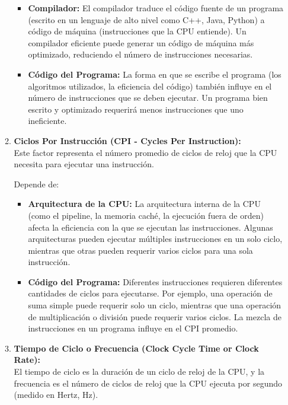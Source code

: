 \documentclass[12pt,letterpaper]{article}
\begin{document}
\begin{enumerate}
\begin{enumerate}[label=\arabic*)]
\begin{itemize}
    \item \textbf{Compilador:} El compilador traduce el código fuente de un programa (escrito en un lenguaje de alto nivel como C++, Java, Python) a código de máquina (instrucciones que la CPU entiende). Un compilador eficiente puede generar un código de máquina más optimizado, reduciendo el número de instrucciones necesarias.
      
    \item \textbf{Código del Programa:} La forma en que se escribe el programa (los algoritmos utilizados, la eficiencia del código) también influye en el número de instrucciones que se deben ejecutar. Un programa bien escrito y optimizado requerirá menos instrucciones que uno ineficiente.
    \end{itemize}
    
  \item \textbf{Ciclos Por Instrucción (CPI - Cycles Per Instruction):}\\
    Este factor representa el número promedio de ciclos de reloj que la CPU necesita para ejecutar una instrucción.
    
    Depende de:\\
    \begin{itemize}
    \item \textbf{Arquitectura de la CPU:} La arquitectura interna de la CPU (como el pipeline, la memoria caché, la ejecución fuera de orden) afecta la eficiencia con la que se ejecutan las instrucciones. Algunas arquitecturas pueden ejecutar múltiples instrucciones en un solo ciclo, mientras que otras pueden requerir varios ciclos para una sola instrucción.
      
    \item \textbf{Código del Programa:} Diferentes instrucciones requieren diferentes cantidades de ciclos para ejecutarse. Por ejemplo, una operación de suma simple puede requerir solo un ciclo, mientras que una operación de multiplicación o división puede requerir varios ciclos. La mezcla de instrucciones en un programa influye en el CPI promedio.
    \end{itemize}
    
  \item \textbf{Tiempo de Ciclo o Frecuencia (Clock Cycle Time or Clock Rate):}\\
    El tiempo de ciclo es la duración de un ciclo de reloj de la CPU, y la frecuencia es el número de ciclos de reloj que la CPU ejecuta por segundo (medido en Hertz, Hz).
    

\end{enumerate}
\end{enumerate}
\end{document}
